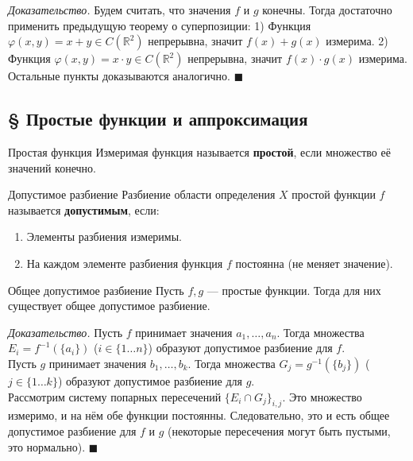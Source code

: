 \documentclass[12pt,a4paper]{article}
\newenvironment{Proof}[1][Доказательство]{\vspace{0.5em}\noindent\textit{#1.}\hspace{0.5em}\ignorespaces}{\hfill$\blacksquare$\vspace{1em}}
\begin{document}
\begin{Proof}
Будем считать, что значения $f$ и $g$ конечны. Тогда достаточно применить предыдущую теорему о суперпозиции:
1) Функция $\varphi(x, y) = x + y \in C(\mathbb{R}^2)$ непрерывна, значит $f(x) + g(x)$ измерима.
2) Функция $\varphi(x, y) = x \cdot y \in C(\mathbb{R}^2)$ непрерывна, значит $f(x) \cdot g(x)$ измерима.
Остальные пункты доказываются аналогично.
\end{Proof}

\subsection{§ Простые функции и аппроксимация}

\begin{Definition}{Простая функция}{}
Измеримая функция называется \textbf{простой}, если множество её значений конечно.
\end{Definition}

\begin{Definition}{Допустимое разбиение}{}
Разбиение области определения $X$ простой функции $f$ называется \textbf{допустимым}, если:
\begin{enumerate}
    \item Элементы разбиения измеримы.
    \item На каждом элементе разбиения функция $f$ постоянна (не меняет значение).
\end{enumerate}
\end{Definition}

\begin{Lemma}{Общее допустимое разбиение}{}
Пусть $f, g$ — простые функции. Тогда для них существует общее допустимое разбиение.
\end{Lemma}

\begin{Proof}
Пусть $f$ принимает значения $a_1, \dots, a_n$. Тогда множества $E_i = f^{-1}(\{a_i\})$ ($i \in \{1 \dots n\}$) образуют допустимое разбиение для $f$. \\
Пусть $g$ принимает значения $b_1, \dots, b_k$. Тогда множества $G_j = g^{-1}(\{b_j\})$ ($j \in \{1 \dots k\}$) образуют допустимое разбиение для $g$. \\
Рассмотрим систему попарных пересечений $\{ E_i \cap G_j \}_{i, j}$. Это множество измеримо, и на нём обе функции постоянны. Следовательно, это и есть общее допустимое разбиение для $f$ и $g$ (некоторые пересечения могут быть пустыми, это нормально).
\end{Proof}
\end{document}
